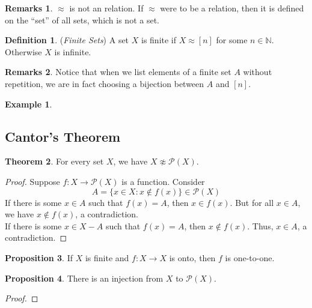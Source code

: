 \documentclass[14pt]{article}
\theoremstyle{definition}
\newtheorem*{remark}{Remarks}
\newtheorem*{example}{Example}
\newtheorem{definition}{Definition}[subsection]
\newtheorem{proposition}[definition]{Proposition}
\newtheorem{theorem}[definition]{Theorem}
\newcommand{\fun}[3]{#1\colon #2\rightarrow#3}
\newcommand{\bb}[1]{\mathbb{#1}}
\begin{document}
\begin{remark}
    $\approx$ is not an relation. If $\approx$ were to be a relation, then it is defined on the 
    “set” of all sets, which is not a set.
\end{remark}
\vspace{2mm}
\begin{definition}
   (\textit{Finite Sets}) A set $X$ is finite if $X\approx [n]$ for some $n\in \bb{N}$. Otherwise $X$ is infinite.
\end{definition}
\begin{remark}
    Notice that when we list elements of a finite set $A$ without repetition, we are in fact
    choosing a bijection between $A$ and $[n]$.
\end{remark}
\vspace{2mm}
\begin{example}
    
\end{example}

\subsection{Cantor's Theorem}
\begin{theorem}
    For every set $X$, we have $X\not\approx\mathcal{P}(X)$.
\end{theorem}
\begin{proof}
    Suppose $\fun{f}{X}{\mathcal{P}(X)}$ is a function. Consider
    \begin{equation*}
        A=\{x\in X\colon x\not\in f(x)\}\in\mathcal{P}(X)
    \end{equation*}
    If there is some $x\in A$ such that $f(x)=A$, then $x\in f(x)$. But for all $x\in A$, we have $x\not\in f(x)$, a contradiction.\\
    If there is some $x\in X-A$ such that $f(x)=A$, then $x\not\in f(x)$. Thus, $x\in A$, a contradiction.
\end{proof}

\begin{proposition}
    If $X$ is finite and $\fun{f}{X}{X}$ is onto, then $f$ is one-to-one.
\end{proposition}

\begin{proposition}
    There is an injection from $X$ to $\mathcal{P}(X)$.
\end{proposition}

\begin{proof}
    
\end{proof}
\end{document}
